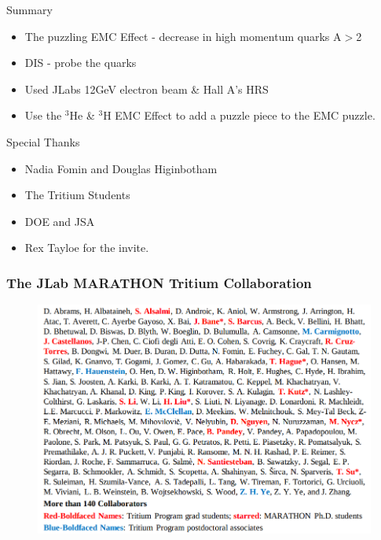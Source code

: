\documentclass[12pt]{beamer}
\begin{document}
\begin{frame}{}
\begin{block}{Summary}
	\begin{itemize}
		\item \small{ The puzzling EMC Effect - decrease in high momentum quarks A$>$2}
		\item DIS - probe the quarks 
		\item Used JLabs 12GeV electron beam \& Hall A's HRS
		\item \small{Use the $^3$He \& $^3$H EMC Effect to add a puzzle piece to the EMC puzzle. }
	\end{itemize}
\end{block}


\begin{block}{Special Thanks}
	\begin{itemize}
		\item Nadia Fomin and Douglas Higinbotham
		\item The Tritium Students 
		\item DOE and JSA 
		\item Rex Tayloe for the invite.
	\end{itemize}
\end{block}
\end{frame}



\begin{frame}
\frametitle{The JLab MARATHON Tritium Collaboration}
\vspace{-15pt}

\begin{figure}
	\includegraphics[width =11.5cm]{../images/collabos_ppl.png}
\end{figure}

\end{frame}
\end{document}
